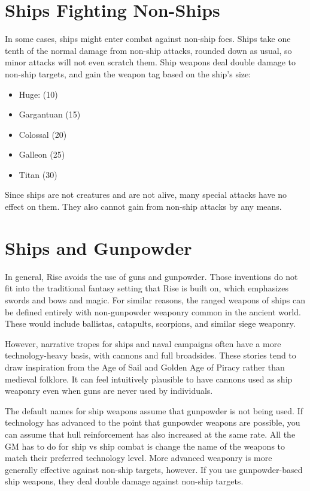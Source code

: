\section{Ships Fighting Non-Ships}
  In some cases, ships might enter combat against non-ship foes.
  Ships take one tenth of the normal damage from non-ship attacks, rounded down as usual, so minor attacks will not even scratch them.
  Ship weapons deal double damage to non-ship targets, and gain the  weapon tag based on the ship's size:
  \begin{itemize}
    \item Huge:  (10)
    \item Gargantuan  (15)
    \item Colossal  (20)
    \item Galleon  (25)
    \item Titan  (30)
  \end{itemize}

  Since ships are not creatures and are not alive, many special attacks have no effect on them.
  They also cannot gain  from non-ship attacks by any means.

\section{Ships and Gunpowder}
  In general, Rise avoids the use of guns and gunpowder.
  Those inventions do not fit into the traditional fantasy setting that Rise is built on, which emphasizes swords and bows and magic.
  For similar reasons, the ranged weapons of ships can be defined entirely with non-gunpowder weaponry common in the ancient world.
  These would include ballistas, catapults, scorpions, and similar siege weaponry.

  However, narrative tropes for ships and naval campaigns often have a more technology-heavy basis, with cannons and full broadsides.
  These stories tend to draw inspiration from the Age of Sail and Golden Age of Piracy rather than medieval folklore.
  It can feel intuitively plausible to have cannons used as ship weaponry even when guns are never used by individuals.

  The default names for ship weapons assume that gunpowder is not being used.
  If technology has advanced to the point that gunpowder weapons are possible, you can assume that hull reinforcement has also increased at the same rate.
  All the GM has to do for ship vs ship combat is change the name of the weapons to match their preferred technology level.
  More advanced weaponry is more generally effective against non-ship targets, however.
  If you use gunpowder-based ship weapons, they deal double damage against non-ship targets.


